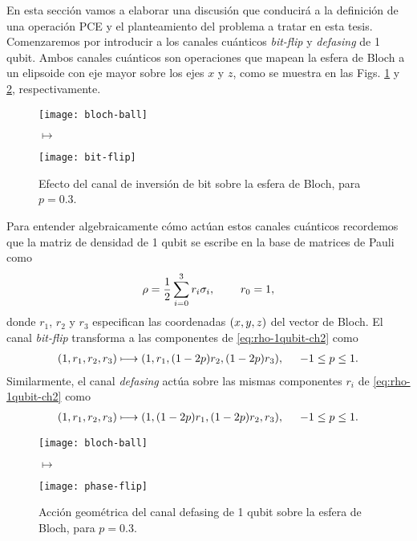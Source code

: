 En esta sección vamos a elaborar una discusión que conducirá a
la definición de una operación PCE y el planteamiento del problema
a tratar en esta tesis. 
Comenzaremos por introducir a los canales cuánticos  
\textit{bit-flip} y \textit{defasing} de 1 qubit. 
Ambos canales cuánticos son operaciones que mapean 
la esfera de Bloch a un elipsoide con eje mayor sobre los ejes $x$ y $z$, 
como se muestra en las Figs. \ref{fig:bit-flip} y \ref{fig:phase-flip}, 
respectivamente.
\begin{figure}
\centering
\begin{minipage}{.4\textwidth}
    \centering
    \texttt{[image: bloch-ball]}
\end{minipage}
\LARGE{$\longmapsto$}
\begin{minipage}{0.4\textwidth}
    \centering
    \texttt{[image: bit-flip]}
\end{minipage}
\caption{
Efecto del canal de inversión de bit sobre la esfera de Bloch, para $p=0.3$.}
\label{fig:bit-flip}
\end{figure}
Para entender algebraicamente cómo actúan estos canales cuánticos 
recordemos que la matriz de densidad de 1 qubit se escribe en la 
base de matrices de Pauli como
\begin{align}\label{eq:rho-1qubit-ch2}
\rho=\frac{1}{2}\sum_{i=0}^3r_i\sigma_i,\hspace{.8cm}r_0=1,
\end{align}
donde $r_1$, $r_2$ y $r_3$ especifican las coordenadas $\qty(x,y,z)$ 
del vector de Bloch. El canal \textit{bit-flip} transforma a las componentes 
de \eqref{eq:rho-1qubit-ch2} como~\cite{nielsen_chuang_2011}
\begin{align}\label{eq:bit-flip-transformation}
\qty(1,r_1,r_2,r_3)\longmapsto \qty(1,r_1,(1-2p)r_2,(1-2p)r_3),
\hspace{.5cm} -1\leq p\leq 1.
\end{align}
Similarmente, el canal \textit{defasing} actúa sobre las mismas
componentes $r_i$ de \eqref{eq:rho-1qubit-ch2}
como~\cite{nielsen_chuang_2011}
\begin{align}\label{eq:defasing-transformation}
\qty(1,r_1,r_2,r_3)\longmapsto \qty(1,(1-2p)r_1,(1-2p)r_2,r_3),
\hspace{.5cm} -1\leq p\leq 1.
\end{align}
\begin{figure}
\centering
\begin{minipage}{.4\textwidth}
    \centering
    \texttt{[image: bloch-ball]}
\end{minipage}
\LARGE{$\longmapsto$}
\begin{minipage}{0.4\textwidth}
    \centering
    \texttt{[image: phase-flip]}
\end{minipage}
\caption{
Acción geométrica del canal defasing de 1 qubit sobre la 
esfera de Bloch, para $p=0.3$.}
\label{fig:phase-flip}
\end{figure}

